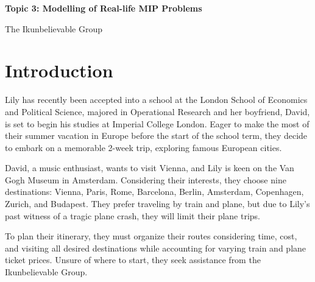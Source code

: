 \documentclass{article}
\newcommand{\titlefont}{\fontsize{21}{32}\selectfont}
\newcommand{\authorfont}{\fontsize{20.74}{24}\selectfont}
\begin{document}
\begin{titlepage}
  \centering
  \vspace*{5cm}
  {\titlefont\textbf{\color{black}Topic 3: Modelling of Real-life MIP Problems}\par}
  \vspace{1.5cm}
  {\authorfont\color{black} The Ikunbelievable Group\par}
  \vfill
\end{titlepage}

\tableofcontents
\clearpage

\renewcommand{\thefootnote}{\fnsymbol{footnote}}
\renewcommand{\thefootnote}{\arabic{footnote}}

\section{Introduction}

Lily has recently been accepted into a school at the London School of Economics
and Political Science, majored in Operational Research and her boyfriend,
David, is set to begin his studies at Imperial College London. Eager to make
the most of their summer vacation in Europe before the start of the school
term, they decide to embark on a memorable 2-week trip, exploring famous
European cities.

David, a music enthusiast, wants to visit Vienna, and Lily is keen on the Van
Gogh Museum in Amsterdam. Considering their interests, they choose nine
destinations: Vienna, Paris, Rome, Barcelona, Berlin, Amsterdam, Copenhagen,
Zurich, and Budapest. They prefer traveling by train and plane, but due to
Lily's past witness of a tragic plane crash, they will limit their plane trips.

To plan their itinerary, they must organize their routes considering time,
cost, and visiting all desired destinations while accounting for varying train
and plane ticket prices. Unsure of where to start, they seek assistance from
the Ikunbelievable Group.
\end{document}
